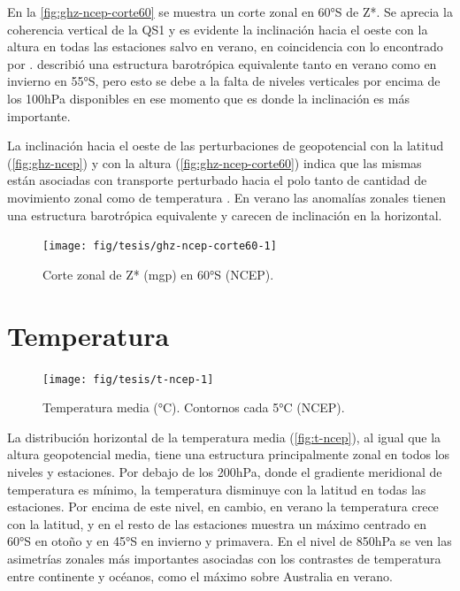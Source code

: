 \documentclass[spanish,a4paper,12pt,oneside]{book}
\begin{document}
En la \autoref{fig:ghz-ncep-corte60} se muestra un corte zonal en 60°S
de Z*. Se aprecia la coherencia vertical de la QS1 y es evidente la
inclinación hacia el oeste con la altura en todas las estaciones salvo
en verano, en coincidencia con lo encontrado por \citet{Quintanar1995a}.
\citet{Karoly1985} describió una estructura barotrópica equivalente
tanto en verano como en invierno en 55°S, pero esto se debe a la falta
de niveles verticales por encima de los 100hPa disponibles en ese
momento que es donde la inclinación es más importante.

La inclinación hacia el oeste de las perturbaciones de geopotencial con
la latitud (\autoref{fig:ghz-ncep}) y con la altura
(\autoref{fig:ghz-ncep-corte60}) indica que las mismas están asociadas
con transporte perturbado hacia el polo tanto de cantidad de movimiento
zonal como de temperatura \citep{James}. En verano las anomalías zonales
tienen una estructura barotrópica equivalente y carecen de inclinación
en la horizontal.

\begin{figure}
\texttt{[image: fig/tesis/ghz-ncep-corte60-1]} \caption{Corte zonal de Z* (mgp) en 60°S (NCEP).}\label{fig:ghz-ncep-corte60}
\end{figure}

\section{Temperatura}\label{temperatura}

\begin{landscape}\begin{figure}

{\centering \texttt{[image: fig/tesis/t-ncep-1]} 

}

\caption{Temperatura media (°C). Contornos cada 5°C (NCEP).}\label{fig:t-ncep}
\end{figure}
\end{landscape}

La distribución horizontal de la temperatura media
(\autoref{fig:t-ncep}), al igual que la altura geopotencial media, tiene
una estructura principalmente zonal en todos los niveles y estaciones.
Por debajo de los 200hPa, donde el gradiente meridional de temperatura
es mínimo, la temperatura disminuye con la latitud en todas las
estaciones. Por encima de este nivel, en cambio, en verano la
temperatura crece con la latitud, y en el resto de las estaciones
muestra un máximo centrado en 60°S en otoño y en 45°S en invierno y
primavera. En el nivel de 850hPa se ven las asimetrías zonales más
importantes asociadas con los contrastes de temperatura entre continente
y océanos, como el máximo sobre Australia en verano.
\end{document}
